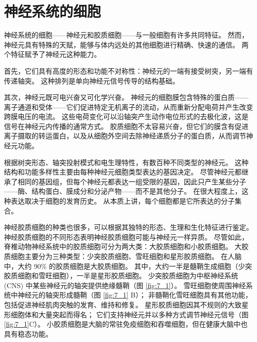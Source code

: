 \chapter{神经系统的细胞} \label{chap:chap7}
神经系统的细胞——神经元和胶质细胞——与一般细胞有许多共同特征。 
然而，神经元具有特殊的天赋，能够与体内远处的其他细胞进行精确、快速的通信。 
两个特征赋予了神经元这种能力。


首先，它们具有高度的形态和功能不对称性：神经元的一端有接受树突，另一端有传递轴突。 
这种排列是单向神经元信号传导的结构基础。


其次，神经元既可电兴奋又可化学兴奋。 
神经元的细胞膜包含特殊的蛋白质——离子通道和受体——它们促进特定无机离子的流动，从而重新分配电荷并产生改变跨膜电压的电流。 
这些电荷变化可以沿轴突产生动作电位形式的去极化波，这是信号在神经元内传播的通常方式。 
胶质细胞不太容易兴奋，但它们的膜含有促进离子摄取的转运蛋白，以及从细胞外空间去除神经递质分子的蛋白质，从而调节神经元功能。


根据树突形态、轴突投射模式和电生理特性，有数百种不同类型的神经元。 
这种结构和功能多样性主要由每种神经元细胞类型表达的基因决定。 
尽管神经元都继承了相同的基因组，但每个神经元都表达一组受限的基因，因此只产生某些分子——酶、结构蛋白、膜成分和分泌产物——而不是其他分子。 
在很大程度上，这种表达取决于细胞的发育历史。 
从本质上讲，每个细胞都是它所表达的分子集合。


神经胶质细胞的种类也很多，可以根据其独特的形态、生理和生化特征进行鉴定。 
神经胶质细胞的不同形态表明神经胶质细胞可能与神经元一样异质。 
尽管如此，脊椎动物神经系统中的胶质细胞可分为两大类：大胶质细胞和小胶质细胞。 
大胶质细胞主要分为三种类型：少突胶质细胞、雪旺细胞和星形胶质细胞。 
在人脑中，大约 90\% 的胶质细胞是大胶质细胞。 
其中，大约一半是髓鞘生成细胞（少突胶质细胞和雪旺细胞），一半是星形胶质细胞。 
少突胶质细胞为中枢神经系统 (CNS) 中某些神经元的轴突提供绝缘髓鞘（图 \ref{fig:7_1}）。 
雪旺细胞使周围神经系统中神经元的轴突形成髓鞘（图 \ref{fig:7_1} B）； 非髓鞘化雪旺细胞具有其他功能，包括促进神经肌肉突触的发育、维持和修复。 
星形胶质细胞因其不规则的大致星形细胞体和大量突起而得名； 它们支持神经元并以多种方式调节神经元信号（图 \ref{fig:7_1}C）。 
小胶质细胞是大脑的常驻免疫细胞和吞噬细胞，但在健康大脑中也具有稳态功能。


